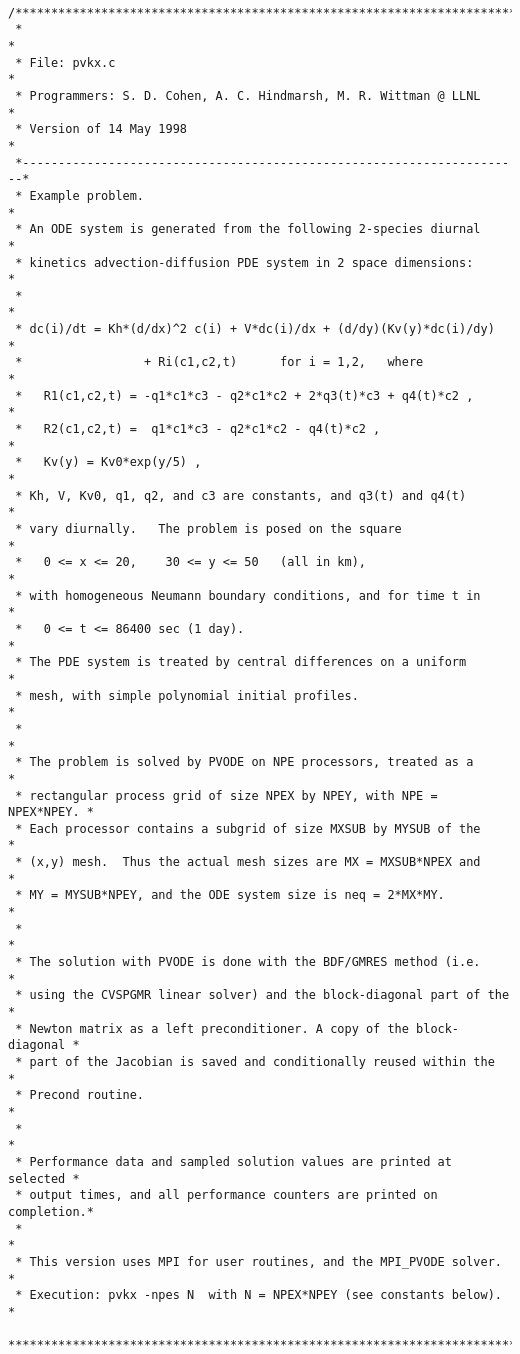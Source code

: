 %

\small

\begin{verbatim}

/************************************************************************
 *                                                                      *
 * File: pvkx.c                                                         *
 * Programmers: S. D. Cohen, A. C. Hindmarsh, M. R. Wittman @ LLNL      *
 * Version of 14 May 1998                                               *
 *----------------------------------------------------------------------*
 * Example problem.                                                     *
 * An ODE system is generated from the following 2-species diurnal      *
 * kinetics advection-diffusion PDE system in 2 space dimensions:       *
 *                                                                      *
 * dc(i)/dt = Kh*(d/dx)^2 c(i) + V*dc(i)/dx + (d/dy)(Kv(y)*dc(i)/dy)    *
 *                 + Ri(c1,c2,t)      for i = 1,2,   where              *
 *   R1(c1,c2,t) = -q1*c1*c3 - q2*c1*c2 + 2*q3(t)*c3 + q4(t)*c2 ,       *
 *   R2(c1,c2,t) =  q1*c1*c3 - q2*c1*c2 - q4(t)*c2 ,                    *
 *   Kv(y) = Kv0*exp(y/5) ,                                             *
 * Kh, V, Kv0, q1, q2, and c3 are constants, and q3(t) and q4(t)        *
 * vary diurnally.   The problem is posed on the square                 *
 *   0 <= x <= 20,    30 <= y <= 50   (all in km),                      *
 * with homogeneous Neumann boundary conditions, and for time t in      *
 *   0 <= t <= 86400 sec (1 day).                                       *
 * The PDE system is treated by central differences on a uniform        *
 * mesh, with simple polynomial initial profiles.                       *
 *                                                                      *
 * The problem is solved by PVODE on NPE processors, treated as a       *
 * rectangular process grid of size NPEX by NPEY, with NPE = NPEX*NPEY. *
 * Each processor contains a subgrid of size MXSUB by MYSUB of the      *
 * (x,y) mesh.  Thus the actual mesh sizes are MX = MXSUB*NPEX and      *
 * MY = MYSUB*NPEY, and the ODE system size is neq = 2*MX*MY.           *
 *                                                                      *
 * The solution with PVODE is done with the BDF/GMRES method (i.e.      *
 * using the CVSPGMR linear solver) and the block-diagonal part of the  *
 * Newton matrix as a left preconditioner. A copy of the block-diagonal *
 * part of the Jacobian is saved and conditionally reused within the    *
 * Precond routine.                                                     *
 *                                                                      *
 * Performance data and sampled solution values are printed at selected *
 * output times, and all performance counters are printed on completion.*
 *                                                                      *
 * This version uses MPI for user routines, and the MPI_PVODE solver.   *   
 * Execution: pvkx -npes N  with N = NPEX*NPEY (see constants below).   *
 ************************************************************************/


\end{verbatim}
